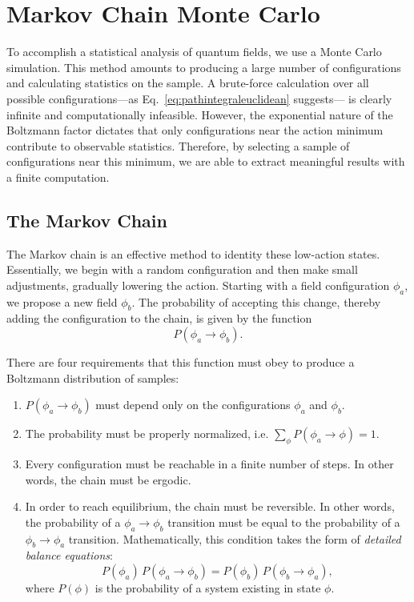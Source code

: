 \documentclass[12pt]{report}
\begin{document}
\section{Markov Chain Monte Carlo}

To accomplish a statistical analysis of quantum fields, we use a Monte Carlo simulation. This method amounts to producing a large number of configurations and calculating statistics on the sample. A brute-force calculation over all possible configurations---as Eq.~\ref{eq:pathintegraleuclidean} suggests--- is clearly infinite and computationally infeasible. However, the exponential nature of the Boltzmann factor dictates that only configurations near the action minimum contribute to observable statistics. Therefore, by selecting a sample of configurations near this minimum, we are able to extract meaningful results with a finite computation.

\subsection{The Markov Chain}
The Markov chain is an effective method to identity these low-action states. Essentially, we begin with a random configuration and then make small adjustments, gradually lowering the action. Starting with a field configuration $\phi_a$, we propose a new field $\phi_b$. The probability of accepting this change, thereby adding the configuration to the chain, is given by the function 
\[P(\phi_a \rightarrow \phi_b).\]

There are four requirements that this function must obey to produce a Boltzmann distribution of samples:
\begin{enumerate}
    \item $P(\phi_a \rightarrow \phi_b)$ must depend only on the configurations $\phi_a$ and $\phi_b$.
    \item The probability must be properly normalized, i.e. $\sum_{\phi} P(\phi_a \rightarrow \phi) = 1$.
    \item Every configuration must be reachable in a finite number of steps. In other words, the chain must be ergodic.
    \item In order to reach equilibrium, the chain must be reversible. In other words, the probability of a $\phi_a\rightarrow\phi_b$ transition must be equal to the probability of a $\phi_b\rightarrow\phi_a$ transition. Mathematically, this condition takes the form of \textit{detailed balance equations}:
\begin{equation}
    \label{eq:detailedbalance}
    P(\phi_a)\,P(\phi_a\rightarrow\phi_b) = P(\phi_b)\,P(\phi_b\rightarrow\phi_a),
\end{equation}
where $P(\phi)$ is the probability of a system existing in state $\phi$.
\end{enumerate}
\end{document}
